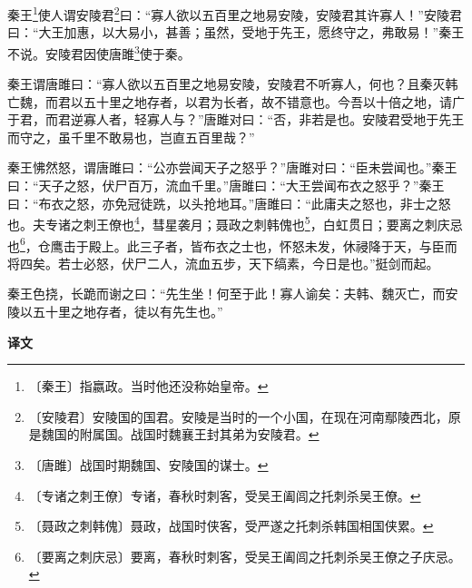 \documentclass[12pt,UTF-8,openany,a4]{ctexbook}
\begin{document}
\begin{large}
    
    秦王\footnote{〔秦王〕\yiwen 指嬴政。当时他还没称始皇帝。}使人谓安陵君\footnote{〔安陵君〕\yiwen 安陵国的国君。安陵是当时的一个小国，在现在河南鄢陵西北，原是魏国的附属国。战国时魏襄王封其弟为安陵君。}曰：“寡人欲以五百里之地易安陵，安陵君其许寡人！”安陵君曰：“大王加惠，以大易小，甚善；虽然，受地于先王，愿终守之，弗敢易！”秦王不说。安陵君因使唐雎\footnote{〔唐雎〕\yiwen 战国时期魏国、安陵国的谋士。}使于秦。
    
    秦王谓唐雎曰：“寡人欲以五百里之地易安陵，安陵君不听寡人，何也？且秦灭韩亡魏，而君以五十里之地存者，以君为长者，故不错意也。今吾以十倍之地，请广于君，而君逆寡人者，轻寡人与？”唐雎对曰：“否，非若是也。安陵君受地于先王而守之，虽千里不敢易也，岂直五百里哉？”
    
    秦王怫然怒，谓唐雎曰：“公亦尝闻天子之怒乎？”唐雎对曰：“臣未尝闻也。”秦王曰：“天子之怒，伏尸百万，流血千里。”唐雎曰：“大王尝闻布衣之怒乎？”秦王曰：“布衣之怒，亦免冠徒跣，以头抢地耳。”唐雎曰：“此庸夫之怒也，非士之怒也。夫专诸之刺王僚也\footnote{〔专诸之刺王僚〕\yiwen 专诸，春秋时刺客，受吴王阖闾之托刺杀吴王僚。}，彗星袭月；聂政之刺韩傀也\footnote{〔聂政之刺韩傀〕\yiwen 聂政，战国时侠客，受严遂之托刺杀韩国相国侠累。}，白虹贯日；要离之刺庆忌也\footnote{〔要离之刺庆忌〕\yiwen 要离，春秋时刺客，受吴王阖闾之托刺杀吴王僚之子庆忌。}，仓鹰击于殿上。此三子者，皆布衣之士也，怀怒未发，休祲降于天，与臣而将四矣。若士必怒，伏尸二人，流血五步，天下缟素，今日是也。”挺剑而起。
    
    秦王色挠，长跪而谢之曰：“先生坐！何至于此！寡人谕矣：夫韩、魏灭亡，而安陵以五十里之地存者，徒以有先生也。”
\end{large}


\newpage

\begin{Large}
    \noindent\textbf{译文}
\end{Large}


\vspace{1em}
\end{document}
